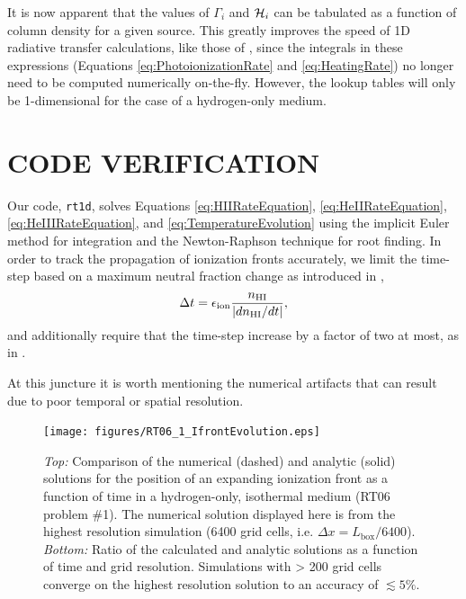 \documentclass[preprint2]{aastex}              %
\begin{document}
It is now apparent that the values of $\Gamma_i$ and $\mathcal{H}_i$ can be tabulated as a function of column density for a given source.  This greatly improves the speed of 1D radiative transfer calculations, like those of \cite{Thomas2008}, since the integrals in these expressions (Equations \ref{eq:PhotoionizationRate} and \ref{eq:HeatingRate}) no longer need to be computed numerically on-the-fly.  However, the lookup tables will only be 1-dimensional for the case of a hydrogen-only medium.

\section{CODE VERIFICATION}
Our code, \texttt{rt1d}, solves Equations \ref{eq:HIIRateEquation}, \ref{eq:HeIIRateEquation}, \ref{eq:HeIIIRateEquation}, and \ref{eq:TemperatureEvolution} using the implicit Euler method for integration and the Newton-Raphson technique for root finding.  In order to track the propagation of ionization fronts accurately, we limit the time-step based on a maximum neutral fraction change as introduced in \citet{Shapiro2004},
\begin{equation}
    \Delta t = \epsilon_{\mathrm{ion}} \frac{n_{\text{HI}}}{|dn_{\text{HI}}/dt|} ,
\end{equation}
and additionally require that the time-step increase by a factor of two at most, as in \citet{Wise2011}.

At this juncture it is worth mentioning the numerical artifacts that can result due to poor temporal or spatial resolution.  

\begin{figure}[htbp]
\centering
\texttt{[image: figures/RT06\_1\_IfrontEvolution.eps]}
\caption{\textit{Top:} Comparison of the numerical (dashed) and analytic (solid) solutions for the position of an expanding ionization front as a function of time in a hydrogen-only, isothermal medium (RT06 problem \#1).  The numerical solution displayed here is from the highest resolution simulation (6400 grid cells, i.e. $\Delta x = L_{\mathrm{box}}/6400$). \textit{Bottom:} Ratio of the calculated and analytic solutions as a function of time and grid resolution.  Simulations with > 200 grid cells converge on the highest resolution solution to an accuracy of $\lesssim 5 \%$.}
\label{fig:RT_Test1_IfrontEvolution}
\end{figure}
\end{document}
